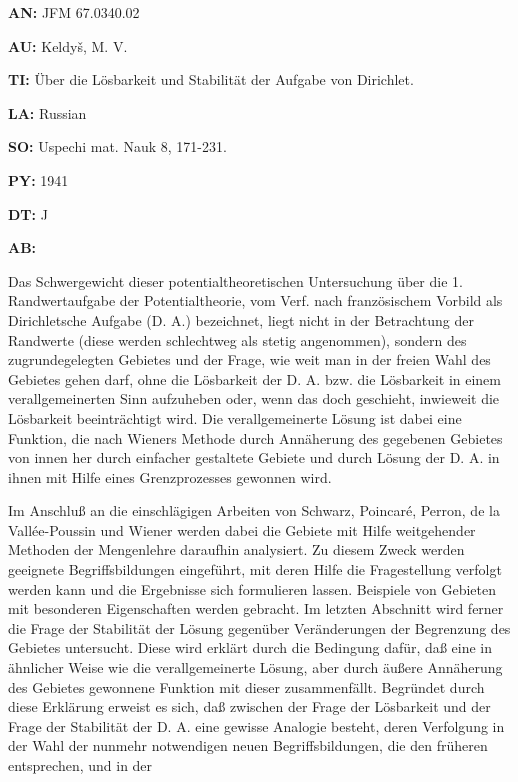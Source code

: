 \item{\bf AN:} JFM 67.0340.02
\item{\bf AU:} Keldy{\v s}, M. V.
\item{\bf TI:} \"Uber die L\"osbarkeit und Stabilit\"at der Aufgabe von Dirichlet.
\item{\bf LA:} Russian
\item{\bf SO:} Uspechi mat. Nauk 8, 171-231.
\item{\bf PY:} 1941
\item{\bf DT:} J
\item{\bf AB:}{\parindent15pt
 Das Schwergewicht dieser potentialtheoretischen Untersuchung \"uber die
1. Randwertaufgabe der Potentialtheorie, vom Verf. nach franz\"osischem Vorbild
als Dirichletsche Aufgabe (D. A.) bezeichnet, liegt nicht in der Betrachtung der
Randwerte (diese werden schlechtweg als stetig angenommen), sondern des
zugrundegelegten Gebietes
und der Frage, wie weit man in der freien Wahl des Gebietes gehen
darf, ohne die L\"osbarkeit
der D. A. bzw. die L\"osbarkeit in einem verallgemeinerten
Sinn aufzuheben oder, wenn das doch geschieht, inwieweit die L\"osbarkeit
beeintr\"achtigt wird.
Die verallgemeinerte L\"osung ist dabei eine Funktion, die nach Wieners
Methode durch Ann\"aherung des gegebenen Gebietes von innen her durch einfacher
gestaltete Gebiete und
durch L\"osung der D. A. in ihnen mit Hilfe eines Grenzprozesses
gewonnen wird.
\par
 Im Anschlu{\ss} an die einschl\"agigen Arbeiten von Schwarz, Poincar\'e,
Perron,
de la Vall\'ee-Poussin
und Wiener werden dabei die Gebiete mit Hilfe weitgehender
Methoden der Mengenlehre daraufhin analysiert. Zu diesem Zweck werden geeignete
Begriffsbildungen eingef\"uhrt,
mit deren Hilfe die Fragestellung verfolgt werden
kann und die Ergebnisse sich formulieren lassen. Beispiele von Gebieten mit
besonderen Eigenschaften
werden gebracht. Im letzten Abschnitt wird ferner die Frage
der Stabilit\"at der L\"osung gegen\"uber Ver\"anderungen der Begrenzung des
Gebietes
untersucht. Diese wird
erkl\"art durch die Bedingung daf\"ur, da{\ss} eine in \"ahnlicher
Weise
wie die verallgemeinerte
L\"osung, aber durch \"au{\ss}ere Ann\"aherung des Gebietes
gewonnene Funktion mit dieser zusammenf\"allt. Begr\"undet durch diese
Erkl\"arung
erweist es sich, da{\ss} zwischen der Frage der L\"osbarkeit und der Frage der
Stabilit\"at
der D. A. eine gewisse
Analogie besteht, deren Verfolgung in der Wahl der nunmehr
notwendigen neuen Begriffsbildungen, die den fr\"uheren entsprechen, und in der
}
